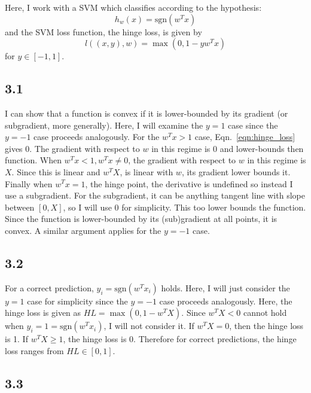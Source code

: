\documentclass[12pt]{amsart}
\begin{document}
Here, I work with a SVM which classifies according to the hypothesis:
\begin{equation} \label{eqn:svm}
h_w(x) = \text{sgn}(w^Tx)
\end{equation}
and the SVM loss function, the hinge loss, is given by
\begin{equation} \label{eqn:hinge_loss}
l((x,y),w) = \max(0,1 - yw^Tx)
\end{equation}
for $y \in [-1,1]$.

\subsection*{3.1}

I can show that a function is convex if it is lower-bounded by its gradient (or subgradient, more generally).  Here, I will examine the $y = 1$ case since the $y = -1$ case proceeds analogously.   For the $w^Tx > 1$ case, Eqn.~\ref{eqn:hinge_loss} gives 0.  The gradient with respect to $w$ in this regime is 0 and lower-bounds then function.  When $w^Tx < 1, w^Tx \neq 0$, the gradient with respect to $w$ in this regime is $X$.  Since this is linear and $w^TX$, is linear with $w$, its gradient lower bounds it.  Finally when $w^Tx = 1$, the hinge point, the derivative is undefined so instead I use a subgradient.  For the subgradient, it can be anything tangent line with slope between $[0,X]$, so I will use 0 for simplicity.  This too lower bounds the function.  Since the function is lower-bounded by its (sub)gradient at all points, it is convex.  A similar argument applies for the $y = -1$ case.

\subsection*{3.2}

For a correct prediction, $y_i = \text{sgn}(w^Tx_i)$ holds.  Here, I will just consider the $y = 1$ case for simplicity since the $y = -1$ case proceeds analogously.  Here, the hinge loss is given as $HL = \max(0,1-w^TX)$.  Since $w^TX < 0$ cannot hold when $y_i = 1 = \text{sgn}(w^Tx_i)$, I will not consider it.  If $w^TX = 0$, then the hinge loss is 1.  If $w^TX \geq 1$, the hinge loss is 0.  Therefore for correct predictions, the hinge loss ranges from $HL \in [0,1]$.

\subsection*{3.3}
\end{document}
